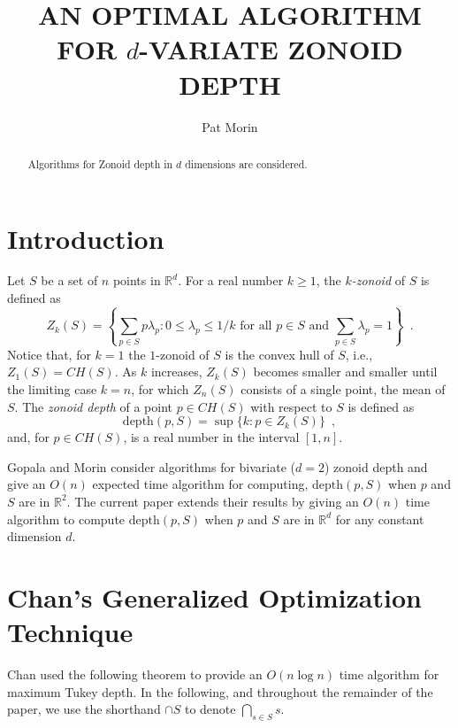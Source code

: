 \documentclass[lotsofwhite]{patmorin}
\title{\MakeUppercase{An Optimal Algorithm
	for} $d$\MakeUppercase{-Variate Zonoid Depth}}
\author{Pat Morin}
\date{}
\newcommand{\CH}{\mathit{CH}}
\newcommand{\Z}{\mathit{Z}}
\newcommand{\depth}{\mathrm{depth}}
\newcommand{\R}{\mathbb{R}}
\begin{document}
\maketitle
\begin{abstract}
Algorithms for Zonoid depth in $d$ dimensions are considered.
\end{abstract}

\section{Introduction}

Let $S$ be a set of $n$ points in $\R^d$.
For a real number $k\ge 1$, the \emph{$k$-zonoid} of $S$ is defined as 
\[
      \Z_k(S) = \left\{\sum_{p\in S}p\lambda_p 
	: \mbox{$0\le \lambda_p \le 1/k$ for all $p\in S$  
	   and $\sum_{p\in S}\lambda_p = 1$}  \right\} \enspace .
\] 
Notice that, for $k=1$ the $1$-zonoid of $S$ is the convex hull of
$S$,  i.e., $\Z_1(S)=\CH(S)$.
As $k$ increases, $\Z_k(S)$ becomes smaller and smaller until
the limiting case $k=n$, for which $\Z_n(S)$ consists of a single point,
the mean of $S$.  The \emph{zonoid depth} of a point
$p\in\CH(S)$ with respect to $S$ is defined as
\[
     \depth(p,S) = \sup\{k : p\in Z_k(S) \} \enspace ,
\]
and, for $p\in\CH(S)$, is a real number in the interval $[1,n]$.

Gopala and Morin \cite{gm06} consider algorithms for bivariate ($d=2$)
zonoid depth and give an $O(n)$ expected time algorithm for computing,
$\depth(p,S)$ when $p$ and $S$ are in $\R^2$.  The current
paper extends their results by giving an $O(n)$ time algorithm to compute
$\depth(p,S)$ when $p$ and $S$ are in $\R^d$ for any constant
dimension $d$.  

\section{Chan's Generalized Optimization Technique}

Chan \cite{c2004} used the following theorem to provide an $O(n\log
n)$ time algorithm for maximum Tukey depth.  In the following, and
throughout the remainder of the paper, we use the shorthand $\cap S$
to denote $\bigcap_{s\in S}s$.
\end{document}
